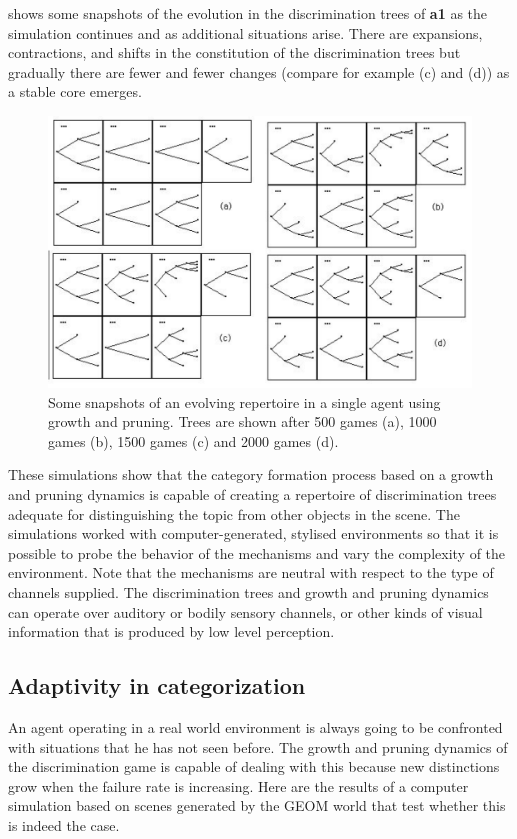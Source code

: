  shows some snapshots of the 
evolution in the discrimination trees of {\bf a1} as
the simulation continues and as additional situations
arise. There are
expansions, contractions, and shifts in the constitution of the 
discrimination trees but gradually there are fewer and 
fewer changes (compare for example (c) and (d)) as a
stable core emerges. 
\begin{figure}[htbp]
  \centerline{\includegraphics[width=.75\textwidth]{chap4/figs/dynatrees}}
\caption{\label{dyna-trees} Some snapshots of an evolving 
repertoire in a single agent using growth and pruning. 
Trees are shown after 500 games (a), 1000 games (b), 1500 games
(c) and 2000 games (d).} 
\end{figure}

These simulations show that the
category formation process based on a growth and pruning
dynamics is capable of creating a repertoire of
discrimination trees adequate for distinguishing 
the topic from other objects in the scene. The simulations 
worked with computer-generated, stylised environments
so that it is possible to probe the behavior of 
the mechanisms and vary the complexity of the environment. 
Note that the mechanisms are neutral with respect 
to the type of channels supplied. The discrimination 
trees and growth and pruning dynamics can operate over
auditory or bodily sensory channels, or other kinds
of visual information that is produced by low level 
perception. 

\subsection{Adaptivity in categorization}

An agent operating in a real world environment is always
going to be confronted with situations that he has 
not seen before. The growth and pruning dynamics of the 
discrimination game is capable of dealing with this because 
new distinctions grow when the failure rate 
is increasing. Here are the results of a computer 
simulation based on scenes generated by the 
GEOM world that test whether this is indeed the case. 

